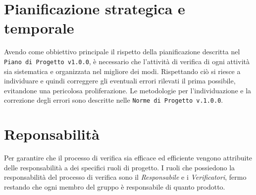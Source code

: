 \section{Pianificazione strategica e temporale}
Avendo come obbiettivo principale il rispetto della pianificazione descritta nel \texttt{Piano di Progetto v1.0.0}, è necessario che l'attività di verifica di ogni attività sia sistematica e organizzata nel migliore dei modi. 
Rispettando ciò si riesce a individuare e quindi correggere gli eventuali errori rilevati il prima possibile, evitandone una pericolosa proliferazione. 
Le metodologie per l'individuazione e la correzione degli errori sono descritte nelle \texttt{Norme di Progetto v.1.0.0}.
\section{Reponsabilità}
Per garantire che il processo di verifica sia efficace ed efficiente vengono attribuite delle responsabilità a dei specifici ruoli di progetto.
I ruoli che possiedono la responsabilità del processo di verifica sono il \textit{Responsabile} e i \textit{Verificatori}, fermo restando che ogni membro del gruppo è responsabile di quanto prodotto.

